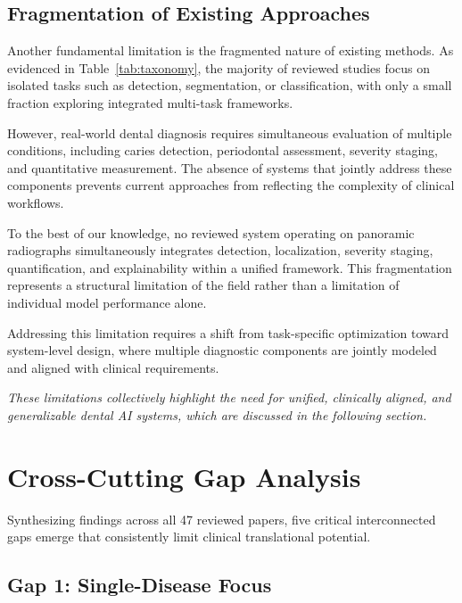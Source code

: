 \documentclass[conference]{IEEEtran}
\begin{document}
\subsection{Fragmentation of Existing Approaches}

Another fundamental limitation is the fragmented nature of existing
methods. As evidenced in Table~\ref{tab:taxonomy}, the majority of
reviewed studies focus on isolated tasks such as detection, segmentation,
or classification, with only a small fraction exploring integrated
multi-task frameworks.

However, real-world dental diagnosis requires simultaneous evaluation of
multiple conditions, including caries detection, periodontal assessment,
severity staging, and quantitative measurement. The absence of systems
that jointly address these components prevents current approaches from
reflecting the complexity of clinical workflows.

To the best of our knowledge, no reviewed system operating on panoramic
radiographs simultaneously integrates detection, localization, severity
staging, quantification, and explainability within a unified framework.
This fragmentation represents a structural limitation of the field
rather than a limitation of individual model performance alone.

Addressing this limitation requires a shift from task-specific
optimization toward system-level design, where multiple diagnostic
components are jointly modeled and aligned with clinical requirements.

\vspace{4pt}
\noindent\textit{These limitations collectively highlight the need for
unified, clinically aligned, and generalizable dental AI systems, which
are discussed in the following section.}

\section{Cross-Cutting Gap Analysis}
\label{sec:gaps}

Synthesizing findings across all 47 reviewed papers, five critical
interconnected gaps emerge that consistently limit clinical translational
potential.

\subsection{Gap 1: Single-Disease Focus}
\end{document}
